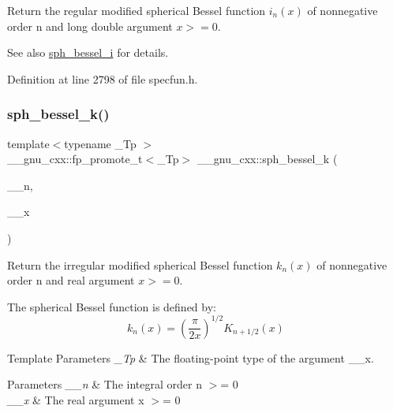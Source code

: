 Return the regular modified spherical Bessel function $ i_n(x) $ of nonnegative order n and {\ttfamily long double} argument $ x >= 0 $.

\begin{DoxySeeAlso}{See also}
\hyperlink{group__mathsf__gnu_ga156b8154b27b7898c8b2abf4284f7323}{sph\+\_\+bessel\+\_\+i} for details. 
\end{DoxySeeAlso}


Definition at line 2798 of file specfun.\+h.

\mbox{\label{group__mathsf__gnu_ga288b28f2c6995d052a4f5f17293cbf1a}} 
\subsubsection{\texorpdfstring{sph\+\_\+bessel\+\_\+k()}{sph\_bessel\_k()}}
{\footnotesize\ttfamily template$<$typename \+\_\+\+Tp $>$ \\
\+\_\+\+\_\+gnu\+\_\+cxx\+::fp\+\_\+promote\+\_\+t$<$\+\_\+\+Tp$>$ \+\_\+\+\_\+gnu\+\_\+cxx\+::sph\+\_\+bessel\+\_\+k (\begin{DoxyParamCaption}\item[{unsigned int}]{\+\_\+\+\_\+n,  }\item[{\+\_\+\+Tp}]{\+\_\+\+\_\+x }\end{DoxyParamCaption})\hspace{0.3cm}{\ttfamily [inline]}}

Return the irregular modified spherical Bessel function $ k_n(x) $ of nonnegative order n and real argument $ x >= 0 $.

The spherical Bessel function is defined by\+: \[ k_n(x) = \left(\frac{\pi}{2x} \right) ^{1/2} K_{n+1/2}(x) \]


\begin{DoxyTemplParams}{Template Parameters}
{\em \+\_\+\+Tp} & The floating-\/point type of the argument {\ttfamily \+\_\+\+\_\+x}. \\
\hline
\end{DoxyTemplParams}

\begin{DoxyParams}{Parameters}
{\em \+\_\+\+\_\+n} & The integral order {\ttfamily  n $>$= 0 } \\
\hline
{\em \+\_\+\+\_\+x} & The real argument {\ttfamily  x $>$= 0 } \\
\hline
\end{DoxyParams}

